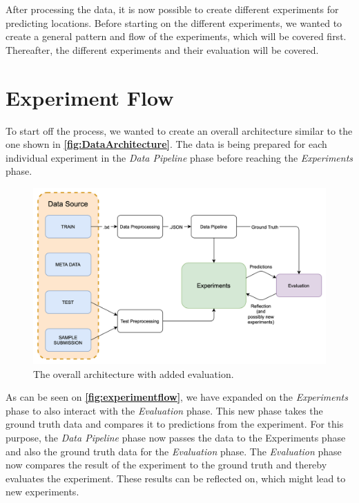 After processing the data, it is now possible to create different experiments for predicting locations. Before starting on the different experiments, we wanted to create a general pattern and flow of the experiments, which will be covered first. Thereafter, the different experiments and their evaluation will be covered.

\section{Experiment Flow}
To start off the process, we wanted to create an overall architecture similar to the one shown in \textbf{\autoref{fig:DataArchitecture}}. The data is being prepared for each individual experiment in the \textit{Data Pipeline} phase before reaching the \textit{Experiments} phase.

\begin{figure}[H]
    \centering
    \includegraphics[scale=.34]{Images/Experiments/ExperimentFlow.png}
    \caption{The overall architecture with added evaluation.}
    \label{fig:experimentflow}
\end{figure}

As can be seen on \textbf{\autoref{fig:experimentflow}}, we have expanded on the \textit{Experiments} phase to also interact with the \textit{Evaluation} phase. This new phase takes the ground truth data and compares it to predictions from the experiment. For this purpose, the \textit{Data Pipeline} phase now passes the data to the Experiments phase and also the ground truth data for the \textit{Evaluation} phase. The \textit{Evaluation} phase now compares the result of the experiment to the ground truth and thereby evaluates the experiment. These results can be reflected on, which might lead to new experiments.

